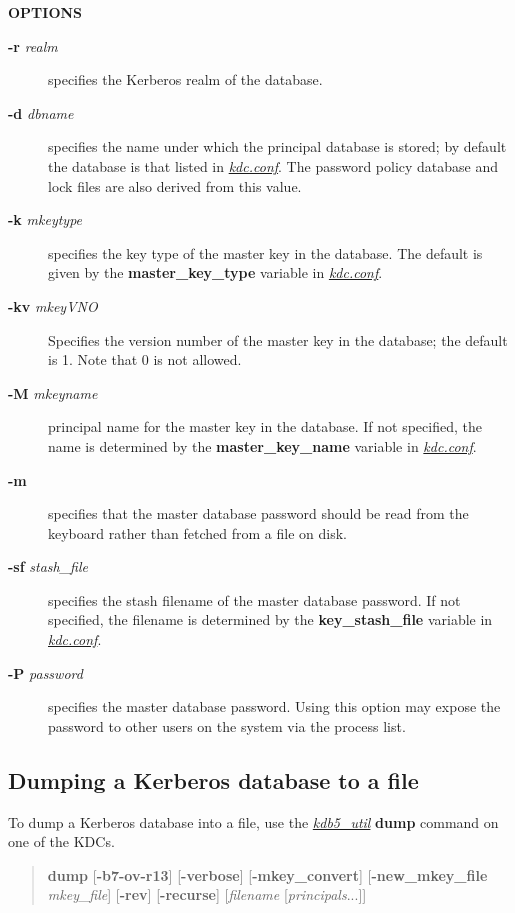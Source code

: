 \documentclass[letterpaper,10pt,english]{sphinxmanual}
\begin{document}
\textbf{OPTIONS}
\begin{description}
\item[{\textbf{-r} \emph{realm}}] \leavevmode
specifies the Kerberos realm of the database.

\item[{\textbf{-d} \emph{dbname}}] \leavevmode
specifies the name under which the principal database is stored;
by default the database is that listed in {\hyperref[admin/conf_files/kdc_conf:kdc-conf-5]{\emph{kdc.conf}}}.  The
password policy database and lock files are also derived from this
value.

\item[{\textbf{-k} \emph{mkeytype}}] \leavevmode
specifies the key type of the master key in the database.  The
default is given by the \textbf{master\_key\_type} variable in
{\hyperref[admin/conf_files/kdc_conf:kdc-conf-5]{\emph{kdc.conf}}}.

\item[{\textbf{-kv} \emph{mkeyVNO}}] \leavevmode
Specifies the version number of the master key in the database;
the default is 1.  Note that 0 is not allowed.

\item[{\textbf{-M} \emph{mkeyname}}] \leavevmode
principal name for the master key in the database.  If not
specified, the name is determined by the \textbf{master\_key\_name}
variable in {\hyperref[admin/conf_files/kdc_conf:kdc-conf-5]{\emph{kdc.conf}}}.

\item[{\textbf{-m}}] \leavevmode
specifies that the master database password should be read from
the keyboard rather than fetched from a file on disk.

\item[{\textbf{-sf} \emph{stash\_file}}] \leavevmode
specifies the stash filename of the master database password.  If
not specified, the filename is determined by the
\textbf{key\_stash\_file} variable in {\hyperref[admin/conf_files/kdc_conf:kdc-conf-5]{\emph{kdc.conf}}}.

\item[{\textbf{-P} \emph{password}}] \leavevmode
specifies the master database password.  Using this option may
expose the password to other users on the system via the process
list.

\end{description}


\subsection{Dumping a Kerberos database to a file}
\label{admin/database:dumping-a-kerberos-database-to-a-file}
To dump a Kerberos database into a file, use the {\hyperref[admin/admin_commands/kdb5_util:kdb5-util-8]{\emph{kdb5\_util}}}
\textbf{dump} command on one of the KDCs.
\begin{quote}

\textbf{dump} {[}\textbf{-b7}\textbar{}\textbf{-ov}\textbar{}\textbf{-r13}{]} {[}\textbf{-verbose}{]}
{[}\textbf{-mkey\_convert}{]} {[}\textbf{-new\_mkey\_file} \emph{mkey\_file}{]} {[}\textbf{-rev}{]}
{[}\textbf{-recurse}{]} {[}\emph{filename} {[}\emph{principals}...{]}{]}
\end{quote}
\end{document}
